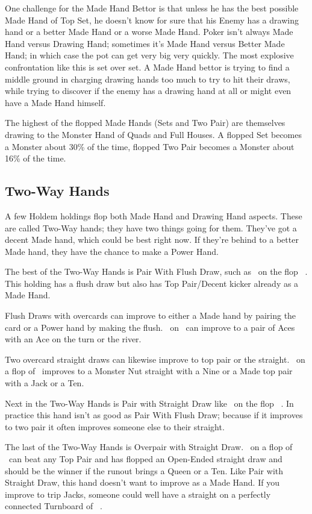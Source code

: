 One challenge for the Made Hand Bettor is that unless he has the best
possible Made Hand of Top Set, he doesn't know for sure that his
Enemy has a drawing hand or a better Made Hand or a worse Made
Hand. Poker isn't always Made Hand versus Drawing Hand; sometimes it's
Made Hand versus Better Made Hand; in which case the pot can get very
big very quickly. The most explosive confrontation like this is set
over set. A Made Hand bettor is trying to find a middle ground in
charging drawing hands too much to try to hit their draws, while
trying to discover if the enemy has a drawing hand at all or might
even have a Made Hand himself.

The highest of the flopped Made Hands (Sets and Two Pair) are themselves
drawing to the Monster Hand of Quads and Full Houses. A flopped Set
becomes a Monster about 30\% of the time, flopped Two Pair becomes a
Monster about 16\% of the time.

\subsection{Two-Way Hands}

A few Holdem holdings flop both Made Hand and Drawing Hand aspects.
These are called Two-Way hands; they have two things going for them.
They've got a decent Made hand, which could be best right now.
If they're behind to a better Made hand, they have the chance to make
a Power Hand.

The best of the Two-Way Hands is Pair With Flush Draw, such as
\Kd\tend\ on the flop \Kc\nined\eigd\ . This holding has a flush
draw but also has Top Pair/Decent kicker already as a Made Hand.

Flush Draws with overcards can improve to either a Made hand by
pairing the card or a Power hand by making the flush. \Ad\sevd\ on
\Kc\nined\eigd\ can improve to a pair of Aces with an Ace on the turn
or the river.

Two overcard straight draws can likewise improve to top pair or the
straight. \Jh\Tc\ on a flop of \eigh\sevc\tres\ improves to a Monster
Nut straight with a Nine or a Made top pair with a Jack or a Ten.

Next in the Two-Way Hands is Pair with Straight Draw like
\tend\nined\ on the flop \tenc\eigh\sevs\ . In practice this hand
isn't as good as Pair With Flush Draw; because if it improves to two
pair it often improves someone else to their straight.

The last of the Two-Way Hands is Overpair with Straight
Draw. \Js\Jc\ on a flop of \tenc\nineh\eigs\ can beat any Top Pair
and has flopped an Open-Ended straight draw and should be the winner
if the runout brings a Queen or a Ten. Like Pair with Straight Draw,
this hand doesn't want to improve as a Made Hand. If you improve to
trip Jacks, someone could well have a straight on a perfectly
connected Turnboard of \tenc\nineh\eigs\Jh\ .

